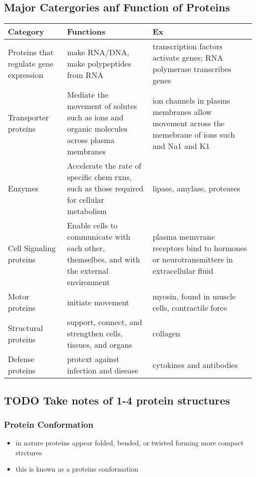 \documentclass[11pt]{article}
\begin{document}
\subsection{Major Catergories anf Function of Proteins}
\label{sec:orge6b7552}
\begin{center}
\begin{tabular}{lll}
Category & Functions & Ex\\
\hline
Proteins that regulate gene expression & make RNA/DNA, make polypeptides from RNA & transcription factors activate genes; RNA polymerase transcribes genes\\
Transporter proteins & Mediate the movement of solutes such as ions and organic molecules across plasma membranes & ion channels in plasms membranes allow movement across the memebrane of ions such and Na1 and K1\\
Enzymes & Accelerate the rate of specific chem rxns, such as those required for cellular metabolism & lipase, amylase, proteases\\
Cell Signaling proteins & Enable cells to communicate with each other, themselbes, and with the external environment & plasma memvrane receptors bind to hormones or neurotransmitters in extracellular fluid\\
Motor proteins & initiate movement & myosin, found in muscle cells, contractile force\\
Structural proteins & support, connect, and strengthen cells, tissues, and organs & collagen\\
Defense proteins & protext against infection and disease & cytokines and antibodies\\
\end{tabular}
\end{center}
\subsection{{\bfseries\sffamily TODO} Take notes of 1-4 protein structures}
\label{sec:org6112d7c}
\subsubsection{Protein Conformation}
\label{sec:org093ae95}
\begin{itemize}
\item in nature proteins appear folded,  bended, or twisted forming more compact strctures
\item this is known as a proteins conformation
\end{itemize}
\end{document}
